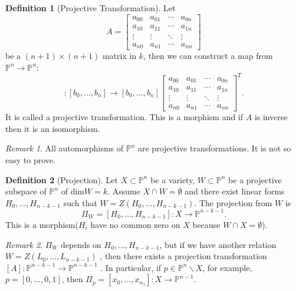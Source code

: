 \documentclass{amsart}
\theoremstyle{plain}
\theoremstyle{definition}
\newtheorem{definition}{Definition}
\theoremstyle{remark}
\newtheorem*{remark}{Remark}
\numberwithin{equation}{section}
\begin{document}
\begin{definition}[Projective Transformation]
	Let \begin{equation}
	A=\left[\begin{matrix}
	a_{00} & a_{01} & \cdots & a_{0n}\\
	a_{10} & a_{11} & \cdots & a_{1n}\\
	\vdots & \vdots & \ddots & \vdots\\
	a_{n0} & a_{n1} & \cdots & a_{nn}
	\end{matrix}\right]
	\end{equation}
	be a $ (n+1)\times (n+1) $ matrix  in $ k $, then we can construct a map from $ \mathbb{P}^n  \to  \mathbb{P}^n $:
	\begin{equation*}
	[A]:	[b_0,\dots,b_n]\to [b_0,\dots,b_n]\left[\begin{matrix}
		a_{00} & a_{01} & \cdots & a_{0n}\\
		a_{10} & a_{11} & \cdots & a_{1n}\\
		\vdots & \vdots & \ddots & \vdots\\
		a_{n0} & a_{n1} & \cdots & a_{nn}
		\end{matrix}\right]^{T}.
	\end{equation*}
	It is called a projective transformation. This is a morphism and if $ A $ is inverse then it is an isomorphism.
\end{definition}
\begin{remark}
	All automorphisms of $ \mathbb{P}^n $  are projective transformations. It is not so easy to prove.
\end{remark}
\begin{definition}[Projection]
	Let $ X\subset\mathbb{P}^n  $ be a variety, $ W\subset \mathbb{P}^n $ be a projective subspace of $ \mathbb{P}^n $ of $ \text{dim}W=k $. Assume $ X\cap W= \emptyset $ and there exist linear forms $ H_0,\dots,H_{n-k-1} $ such that $ W=Z(H_0,\dots,H_{n-k-1}) $. The projection from $ W $ is 
	\begin{equation*}
		\Pi_W=[H_0,\dots,H_{n-k-1}]:X\to \mathbb{P}^{n-k-1}.
	\end{equation*}
	This is a morphism($ H_i $ have no common zero on $ X $ because $ W\cap X=\emptyset $).
 \end{definition}
 \begin{remark}
 	$ \Pi_W $ depends on $ H_0,\dots,H_{n-k-1} $, but if we have another relation $ W=Z(L_0,\dots,L_{n-k-1}) $ , then there exists a projection transformation $ [A]:\mathbb{P}^{n-k-1}\to \mathbb{P}^{n-k-1} $ . In particular, if $ p\in \mathbb{P}^n\backslash X $, for example, $ p=[0,\dots,0,1] $, then $ \Pi_p=[x_0,\dots,x_{n_1}] :X\to \mathbb{P}^{n-1}$. 
 \end{remark}
\end{document}
